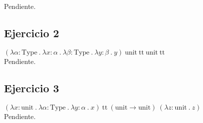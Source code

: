 \documentclass[a4paper]{article}
\begin{document}
Pendiente.

\subsection{Ejercicio 2}

$(\lambda \alpha : \text{Type}\ .\
  \lambda x : \alpha\ .\
  \lambda \beta : \text{Type}\ .\
  \lambda y : \beta\ .\
  y)\
 \text{unit}\ \text{tt}\ \text{unit}\ \text{tt}$\\

Pendiente.

\subsection{Ejercicio 3}

$(\lambda x : \text{unit}\ .\
  \lambda \alpha : \text{Type}\ .\
  \lambda y : \alpha\ .\
  x)\
 \text{tt}\ (\text{unit} \rightarrow \text{unit})\
 (\lambda z : \text{unit}\ .\
  z)$\\

Pendiente.
\end{document}
